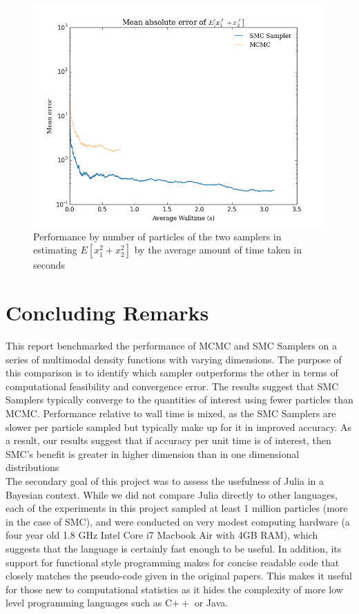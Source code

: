 \documentclass[12pt]{elsarticle}
\begin{document}
\begin{figure}[htbp]
\begin{center}
\includegraphics[width = \textwidth]{plots/2d-errors_walltime.png}
\caption{Performance by number of particles of the two samplers in estimating $E[x_1^2 + x_2^2]$ by the average amount of time taken in seconds}
\label{multi_walltime}
\end{center}
\end{figure}




\section*{Concluding Remarks}
This report benchmarked the performance of MCMC and SMC Samplers on a series of multimodal density functions with varying dimensions. The purpose of this comparison is to identify which sampler outperforms the other in terms of computational feasibility and convergence error. The results suggest that SMC Samplers typically converge to the quantities of interest using fewer particles than MCMC. Performance relative to wall time is mixed, as the SMC Samplers are slower per particle sampled but typically make up for it in improved accuracy. As a result, our results suggest that if accuracy per unit time is of interest, then SMC's benefit is greater in higher dimension than in one dimensional distributions\\

The secondary goal of this project was to assess the usefulness of Julia in a Bayesian context. While we did not compare Julia directly to other languages, each of the experiments in this project sampled at least 1 million particles (more in the case of SMC), and were conducted on very modest computing hardware (a four year old 1.8 GHz Intel Core i7 Macbook Air with 4GB RAM), which suggests that the language is certainly fast enough to be useful. In addition, its support for functional style programming makes for concise readable code that closely matches the pseudo-code given in the original papers. This makes it useful for those new to computational statistics as it hides the complexity of more low level programming languages such as C$++$ or Java.
\end{document}
